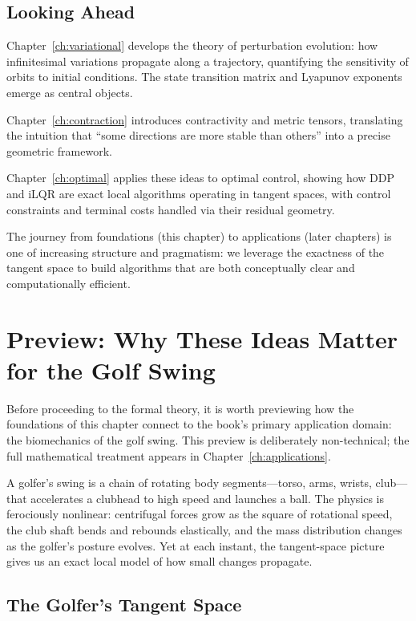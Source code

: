 \subsection{Looking Ahead}

Chapter~\ref{ch:variational} develops the theory of perturbation evolution: how infinitesimal
variations propagate along a trajectory, quantifying the sensitivity of orbits to initial
conditions. The state transition matrix and Lyapunov exponents emerge as central objects.

Chapter~\ref{ch:contraction} introduces contractivity and metric tensors, translating the
intuition that ``some directions are more stable than others'' into a precise geometric
framework.

Chapter~\ref{ch:optimal} applies these ideas to optimal control, showing how DDP and iLQR
are exact local algorithms operating in tangent spaces, with control constraints and
terminal costs handled via their residual geometry.

The journey from foundations (this chapter) to applications (later chapters) is one of increasing
structure and pragmatism: we leverage the exactness of the tangent space to build algorithms
that are both conceptually clear and computationally efficient.


\section{Preview: Why These Ideas Matter for the Golf Swing}

Before proceeding to the formal theory, it is worth previewing how the foundations of this
chapter connect to the book's primary application domain: the biomechanics of the golf swing.
This preview is deliberately non-technical; the full mathematical treatment appears in
Chapter~\ref{ch:applications}.

\begin{laymansbox}
A golfer's swing is a chain of rotating body segments---torso, arms, wrists, club---that
accelerates a clubhead to high speed and launches a ball. The physics is ferociously
nonlinear: centrifugal forces grow as the square of rotational speed, the club shaft
bends and rebounds elastically, and the mass distribution changes as the golfer's posture
evolves. Yet at each instant, the tangent-space picture gives us an exact local model of
how small changes propagate.
\end{laymansbox}

\subsection{The Golfer's Tangent Space}

